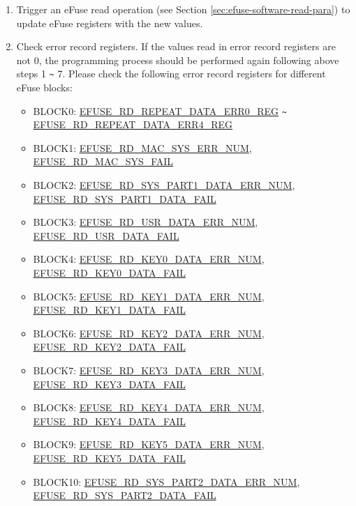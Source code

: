 \documentclass[main\_\_EN.tex]{subfiles}
\begin{document}
\begin{enumerate}
\item Trigger an eFuse read operation (see Section \ref{sec:efuse-software-read-para}) to update eFuse registers with the new values.
\item Check error record registers. If the values read in error record registers are not 0, the programming process should be performed again following above steps 1 \verb+~+ 7. Please check the following error record registers for different eFuse blocks:
\begin{itemize}
    \item BLOCK0: \hyperref[regdesc:EFUSERDREPEATDATAERR0REG]{EFUSE\_RD\_REPEAT\_DATA\_ERR0\_REG} \verb+~+ \hyperref[regdesc:EFUSERDREPEATDATAERR4REG]{EFUSE\_RD\_REPEAT\_DATA\_ERR4\_REG}
    \item BLOCK1: \hyperref[fielddesc:EFUSERDMACSYSERRNUM] {EFUSE\_RD\_MAC\_SYS\_ERR\_NUM}, \hyperref[fielddesc:EFUSERDMACSYSFAIL] {EFUSE\_RD\_MAC\_SYS\_FAIL}
    \item BLOCK2: \hyperref[fielddesc:EFUSERDSYSPART1DATAERRNUM] {EFUSE\_RD\_SYS\_PART1\_DATA\_ERR\_NUM}, \hyperref[fielddesc:EFUSERDSYSPART1DATAFAIL] {EFUSE\_RD\_SYS\_PART1\_DATA\_FAIL}
    \item BLOCK3: \hyperref[fielddesc:EFUSERDUSRDATAERRNUM] {EFUSE\_RD\_USR\_DATA\_ERR\_NUM}, \hyperref[fielddesc:EFUSERDUSRDATAFAIL] {EFUSE\_RD\_USR\_DATA\_FAIL}
    \item BLOCK4: \hyperref[fielddesc:EFUSERDKEY0DATAERRNUM] {EFUSE\_RD\_KEY0\_DATA\_ERR\_NUM}, \hyperref[fielddesc:EFUSERDKEY0DATAFAIL] {EFUSE\_RD\_KEY0\_DATA\_FAIL}
    \item BLOCK5: \hyperref[fielddesc:EFUSERDKEY1DATAERRNUM] {EFUSE\_RD\_KEY1\_DATA\_ERR\_NUM}, \hyperref[fielddesc:EFUSERDKEY1DATAFAIL] {EFUSE\_RD\_KEY1\_DATA\_FAIL}
    \item BLOCK6: \hyperref[fielddesc:EFUSERDKEY2DATAERRNUM] {EFUSE\_RD\_KEY2\_DATA\_ERR\_NUM}, \hyperref[fielddesc:EFUSERDKEY2DATAFAIL] {EFUSE\_RD\_KEY2\_DATA\_FAIL}
    \item BLOCK7: \hyperref[fielddesc:EFUSERDKEY3DATAERRNUM] {EFUSE\_RD\_KEY3\_DATA\_ERR\_NUM}, \hyperref[fielddesc:EFUSERDKEY3DATAFAIL] {EFUSE\_RD\_KEY3\_DATA\_FAIL}
    \item BLOCK8: \hyperref[fielddesc:EFUSERDKEY4DATAERRNUM] {EFUSE\_RD\_KEY4\_DATA\_ERR\_NUM}, \hyperref[fielddesc:EFUSERDKEY4DATAFAIL] {EFUSE\_RD\_KEY4\_DATA\_FAIL}
    \item BLOCK9: \hyperref[fielddesc:EFUSERDKEY5DATAERRNUM] {EFUSE\_RD\_KEY5\_DATA\_ERR\_NUM}, \hyperref[fielddesc:EFUSERDKEY5DATAFAIL] {EFUSE\_RD\_KEY5\_DATA\_FAIL}
    \item BLOCK10: \hyperref[fielddesc:EFUSERDSYSPART2DATAERRNUM] {EFUSE\_RD\_SYS\_PART2\_DATA\_ERR\_NUM}, \hyperref[fielddesc:EFUSERDSYSPART2DATAFAIL] {EFUSE\_RD\_SYS\_PART2\_DATA\_FAIL}
\end{itemize}
\end{enumerate}
\end{document}
